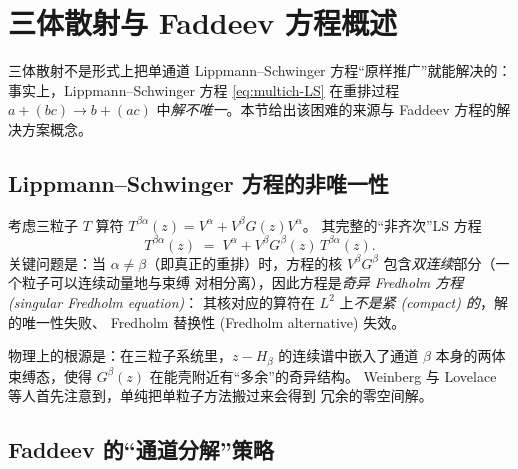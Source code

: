 \section{三体散射与 Faddeev 方程概述}
\label{sec:multich-faddeev}

三体散射不是形式上把单通道 Lippmann–Schwinger 方程“原样推广”就能解决的：
事实上，Lippmann–Schwinger 方程 \eqref{eq:multich-LS} 在重排过程
$a+(bc)\to b+(ac)$ 中\emph{解不唯一}。本节给出该困难的来源与
Faddeev 方程的解决方案概念。

\subsection{Lippmann–Schwinger 方程的非唯一性}

考虑三粒子 $T$ 算符 $T^{\beta\alpha}(z)=V^\alpha+V^\beta G(z)V^\alpha$。
其完整的“非齐次”LS 方程
\begin{equation}
  T^{\beta\alpha}(z)\;=\;V^\alpha + V^\beta G^\beta(z)\,T^{\beta\alpha}(z) .
\end{equation}
关键问题是：当 $\alpha\ne\beta$（即真正的重排）时，方程的核
$V^\beta G^\beta$ 包含\emph{双连续}部分（一个粒子可以连续动量地与束缚
对相分离），因此方程是\emph{奇异 Fredholm 方程 (singular Fredholm equation)}：
其核对应的算符在 $L^2$ 上\emph{不是紧 (compact) 的}，解的唯一性失败、
Fredholm 替换性 (Fredholm alternative) 失效。

物理上的根源是：在三粒子系统里，$z-H_\beta$ 的连续谱中嵌入了通道 $\beta$
本身的两体束缚态，使得 $G^\beta(z)$ 在能壳附近有“多余”的奇异结构。
Weinberg 与 Lovelace 等人首先注意到，单纯把单粒子方法搬过来会得到
冗余的零空间解。

\subsection{Faddeev 的“通道分解”策略}

